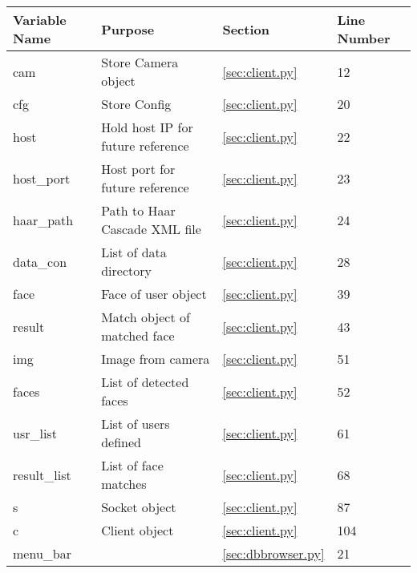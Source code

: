 \documentclass[12pt,a4paper]{report}
\begin{document}
\begin{table}[H]
    \begin{tabular}{|l|m{6cm}|l|l|}
    \hline
    Variable Name & Purpose                                            & Section                   & Line Number \\ \hline
    cam           & Store Camera object                                & \ref{sec:client.py} & 12          \\ \hline
    cfg           & Store Config                                       & \ref{sec:client.py} & 20          \\ \hline
    host          & Hold host IP for future reference                  & \ref{sec:client.py} & 22          \\ \hline
    host\_port    & Host port for future reference                     & \ref{sec:client.py} & 23          \\ \hline
    haar\_path    & Path to Haar Cascade XML file                      & \ref{sec:client.py} & 24          \\ \hline
    data\_con     & List of data directory                             & \ref{sec:client.py} & 28          \\ \hline
    face          & Face of user object                                & \ref{sec:client.py} & 39          \\ \hline
    result        & Match object of matched face                       & \ref{sec:client.py} & 43          \\ \hline
    img           & Image from camera                                  & \ref{sec:client.py} & 51          \\ \hline
    faces         & List of detected faces                             & \ref{sec:client.py} & 52          \\ \hline
    usr\_list     & List of users defined                              & \ref{sec:client.py} & 61          \\ \hline
    result\_list  & List of face matches                               & \ref{sec:client.py} & 68          \\ \hline
    s             & Socket object                                      & \ref{sec:client.py} & 87          \\ \hline
    c             & Client object                                      & \ref{sec:client.py} & 104         \\ \hline
    menu\_bar     & ~                                                  & \ref{sec:dbbrowser.py} & 21          \\ \hline

\end{tabular}
\end{table}
\end{document}
